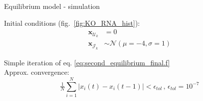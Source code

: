 
\begin{frame}{Equilibrium model - simulation}
\label{sec:prim}

Initial conditions (fig.~\ref{fig:KO_RNA_hist}):
\begin{subequations}
\begin{align}
\boldsymbol{x}_{\mathcal{U}_k} &= 0
\\
\boldsymbol{x}_{\mathcal{J}_k} &\sim \mathcal{N}(\mu=-4, \sigma=1)
\end{align}
\end{subequations}

Simple iteration of eq. \ref{eq:second_equilibrium_final.f} \\
Approx. convergence:
\begin{equation}
\label{eq:convergence}
\tfrac{1}{N} \sum_{i=1}^N |x_i(t)-x_i(t-1)| < \epsilon_{tol} \,,\,\epsilon_{tol}=10^{-7}
\end{equation}

\end{frame}
